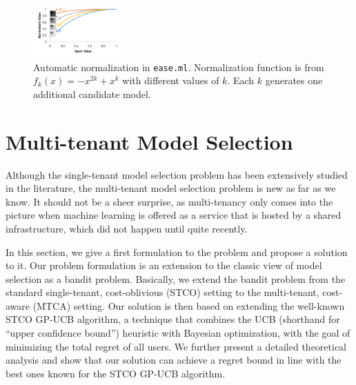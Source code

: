 \documentclass[letterpaper]{vldb}
\newcommand{\eml}{\texttt{ease.ml}\xspace}
\begin{document}
\begin{figure}[t]
\centering
\includegraphics[width=0.3\textwidth]{figures/normalize}
\vspace{-2em}
\caption{Automatic normalization in \eml. Normalization function
is from $f_k(x) = -x^{2k} + x^{k}$ with different 
values of $k$. Each $k$ generates one additional candidate
 model.}
 \label{fig:normalization}
\end{figure}






\section{Multi-tenant Model Selection}\label{sec:multitenant}

Although the single-tenant model selection problem has been extensively studied in the literature, the multi-tenant model selection problem is new as far as we know.
It should not be a sheer surprise, as multi-tenancy only comes into the picture when machine learning is offered as a service that is hosted by a shared infrastructure, which did not happen until quite recently.

In this section, we give a first formulation to the problem and propose a solution to it.
Our problem formulation is an extension to the classic view of model selection as a bandit problem.
Basically, we extend the bandit problem from the standard single-tenant, cost-oblivious (STCO) setting to the multi-tenant, cost-aware (MTCA) setting.
Our solution is then based on extending the well-known STCO GP-UCB algorithm, a technique that combines the UCB (shorthand for ``upper confidence bound'') heuristic with Bayesian optimization, with the goal of minimizing the total regret of all users.
We further present a detailed theoretical analysis and show that our solution can achieve a regret bound in line with the best ones known for the STCO GP-UCB algorithm.
\end{document}
